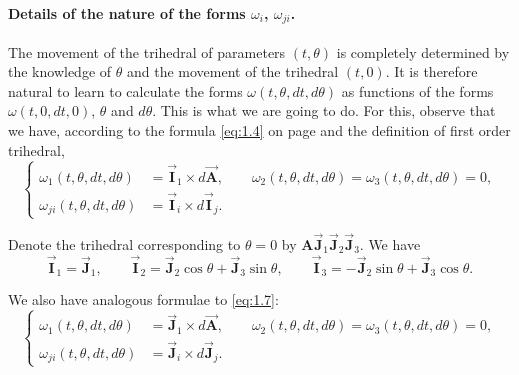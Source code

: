 \documentclass[leqno,11pt]{book}
\numberwithin{equation}{chapter}
\theoremstyle{shape1}
\theoremstyle{shapesmall}
\newcommand{\rvec}[1]{\vec{\mathbf{#1}}}
\newcommand{\ivec}{\rvec{I}}
\newcommand{\jvec}{\rvec{J}}
\begin{document}
\paragraph{Details of the nature of the forms $\omega_i$, $\omega_{ji}$.}
\label{sec:18}
The movement of the trihedral of parameters $(t,\theta)$ is completely determined by the knowledge of $\theta$ and the movement of the trihedral $(t,0)$. It is therefore natural to learn to calculate the forms $\omega(t,\theta,dt,d\theta)$ as functions of the forms $\omega(t,0,dt,0)$, $\theta$ and $d\theta$. This is what we are going to do. For this, observe that we have, according to the formula \eqref{eq:1.4} on page \pageref{eq:1.4} and the definition of first order trihedral,
\begin{equation}
  \label{eq:1.7}
  \left\{
    \begin{aligned}
      \omega_{1}(t,\theta,dt,d\theta)&=\ivec_{1}\times d{\rvec{A}},\qquad\omega_{2}(t,\theta,dt,d\theta)=\omega_{3}(t,\theta,dt,d\theta)=0,\\
      \omega_{ji}(t,\theta,dt,d\theta)&=\ivec_{i}\times d\ivec_{j}.
    \end{aligned}
  \right.
\end{equation}

Denote the trihedral corresponding to $\theta=0$ by $\mathbf{A}{\jvec}_{1}{\jvec}_{2}{\jvec}_{3}$. We have
\begin{equation}
  \label{eq:1.8}
  \ivec_{1}={\jvec}_{1},\qquad\ivec_{2}={\jvec}_{2}\cos\theta+{\jvec}_{3}\sin\theta,\qquad\ivec_{3}=-{\jvec}_{2}\sin\theta+{\jvec}_{3}\cos\theta.
\end{equation}

We also have analogous formulae to \eqref{eq:1.7}:
\begin{equation}
  \label{eq:1.9}
  \left\{
    \begin{aligned}
      \omega_{1}(t,\theta,dt,d\theta)&={\jvec}_{1}\times d{\rvec{A}},\qquad\omega_{2}(t,\theta,dt,d\theta)=\omega_{3}(t,\theta,dt,d\theta)=0,\\
      \omega_{ji}(t,\theta,dt,d\theta)&={\jvec}_{i}\times d{\jvec}_{j}.
    \end{aligned}
  \right.  
\end{equation}
\end{document}
